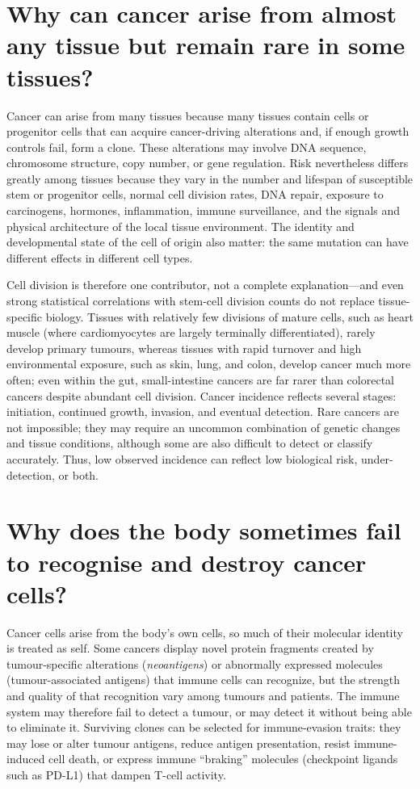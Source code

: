 \documentclass[11pt,oneside]{report}
\begin{document}
\section{Why can cancer arise from almost any tissue but remain rare in some tissues?}

Cancer can arise from many tissues because many tissues contain cells or
progenitor cells that can acquire cancer-driving alterations and, if enough
growth controls fail, form a clone. These alterations may involve DNA sequence,
chromosome structure, copy number, or gene regulation. Risk nevertheless differs
greatly among tissues because they vary in the number and lifespan of susceptible
stem or progenitor cells, normal cell
division rates, DNA repair, exposure to carcinogens, hormones, inflammation,
immune surveillance, and the signals and physical architecture of the local
tissue environment. The identity and developmental state of the cell of origin
also matter: the same mutation can have different effects in different cell
types.

Cell division is therefore one contributor, not a complete explanation—and
even strong statistical correlations with stem-cell division counts do not
replace tissue-specific biology. Tissues with relatively few divisions of
mature cells, such as heart muscle (where cardiomyocytes are largely terminally
differentiated), rarely develop primary tumours, whereas tissues with rapid
turnover and high environmental exposure, such as skin, lung, and colon,
develop cancer much more often; even within the gut, small-intestine cancers
are far rarer than colorectal cancers despite abundant cell division. Cancer incidence reflects several stages:
initiation, continued growth, invasion, and eventual detection. Rare cancers
are not impossible; they may require an uncommon combination of genetic changes
and tissue conditions, although some are also difficult to detect or classify
accurately. Thus, low observed incidence can reflect low biological risk,
under-detection, or both.

\section{Why does the body sometimes fail to recognise and destroy cancer cells?}

Cancer cells arise from the body's own cells, so much of their molecular
identity is treated as self. Some cancers display novel protein fragments created by
tumour-specific alterations (\emph{neoantigens}) or abnormally expressed
molecules (tumour-associated antigens) that immune cells can recognize, but the
strength and quality of that recognition vary among tumours and patients. The
immune system may therefore fail to detect a tumour, or may detect it without
being able to eliminate it. Surviving clones can be selected for immune-evasion
traits: they may lose or alter tumour antigens, reduce antigen presentation,
resist immune-induced cell death, or express immune ``braking'' molecules
(checkpoint ligands such as PD-L1) that dampen T-cell activity.
\end{document}
